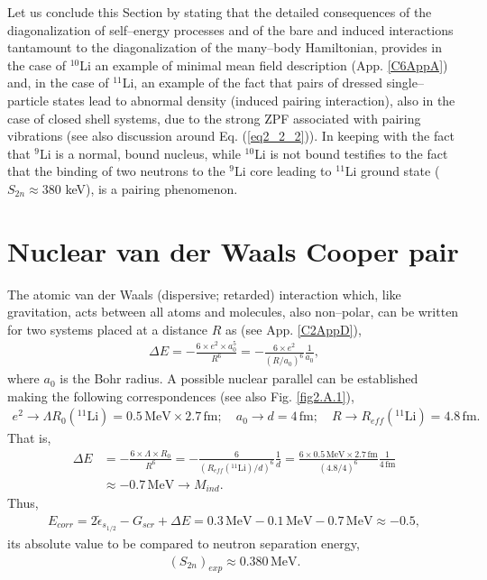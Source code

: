  
 Let us conclude this Section by stating that the detailed consequences  of the diagonalization of self--energy processes and of the bare and induced interactions  tantamount to the diagonalization of the many--body Hamiltonian, provides in the case of $^{10}$Li an example of minimal mean field description  (App. \ref{C6AppA}) and, in the case of $^{11}$Li, an example of the fact that pairs of dressed single--particle states lead to abnormal density (induced pairing interaction), also in the case of closed shell systems, due to the strong ZPF associated with pairing vibrations (see also discussion around Eq. (\ref{eq2_2_2})). In keeping with the fact that $^9$Li is a normal, bound nucleus, while $^{10}$Li is not bound testifies to the fact that the binding of two neutrons to the $^9$Li core leading to $^{11}$Li ground state ($S_{2n}\approx 380$ keV), is a pairing phenomenon. 

 \section{Nuclear van der Waals Cooper pair}\label{C2SG2}
 The atomic van der Waals (dispersive; retarded) interaction which, like gravitation,  acts between all atoms and molecules, also non--polar, can be written for two systems placed at a distance $R$ as (see App. \ref{C2AppD}), 
 \begin{align}\label{eq1C2AppG}
 \Delta E=-\frac{6\times e^2 \times a_0^5}{R^6}=-\frac{6\times e^2}{(R/a_0)^6}\frac{1}{a_0},
 \end{align}
 where $a_0$ is the Bohr radius. A possible nuclear parallel can be established making the following correspondences (see also Fig. \ref{fig2.A.1}),
 \begin{align*}
e^2\rightarrow \Lambda R_0 (^{11}\text{Li})=0.5\, \text{MeV}\times 2.7 \,\text{fm};\quad a_0\rightarrow d=4\,\text{fm};\quad R\rightarrow R_{eff} (^{11}\text{Li})=4.8\,\text{fm}.
 \end{align*} 
 That is,
  \begin{align*}
  \Delta E&=-\frac{6\times \Lambda\times R_0}{R^6}=-\frac{6}{(R_{eff} (^{11}\text{Li})/d)^6}\frac{1}{d}=\frac{6\times 0.5\,\text{MeV}\times 2.7 \,\text{fm}}{(4.8/4)^6}\frac{1}{4\,\text{fm}}\\
&  \approx -0.7\,\text{MeV}\rightarrow M_{ind}.
  \end{align*}
  Thus,
 \begin{align*}
E_{corr}=2\tilde{\epsilon}_{s_{1/2}}-G_{scr}+\Delta E=0.3\,\text{MeV}-0.1\,\text{MeV}-0.7\,\text{MeV}\approx -0.5,
 \end{align*} 
 its absolute value 
to be compared to neutron separation energy, 
 \begin{align*}
(S_{2n})_{exp}\approx 0.380 \,\text{MeV}.
 \end{align*} 


